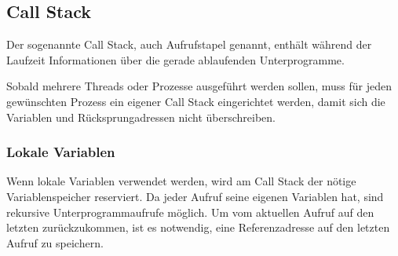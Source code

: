 

\subsection{Call Stack}
Der sogenannte Call Stack, auch Aufrufstapel genannt, enthält während der Laufzeit Informationen über die gerade ablaufenden 
Unterprogramme. 


Sobald mehrere Threads oder Prozesse ausgeführt werden sollen, muss für jeden gewünschten Prozess ein eigener Call Stack eingerichtet
werden, damit sich die Variablen und Rücksprungadressen nicht überschreiben.

\subsubsection{Lokale Variablen}
Wenn lokale Variablen verwendet werden, wird am Call Stack der nötige Variablenspeicher reserviert. Da jeder Aufruf seine
eigenen Variablen hat, sind rekursive Unterprogrammaufrufe möglich. Um vom aktuellen Aufruf auf den letzten zurückzukommen, ist
es notwendig, eine Referenzadresse auf den letzten Aufruf zu speichern.


